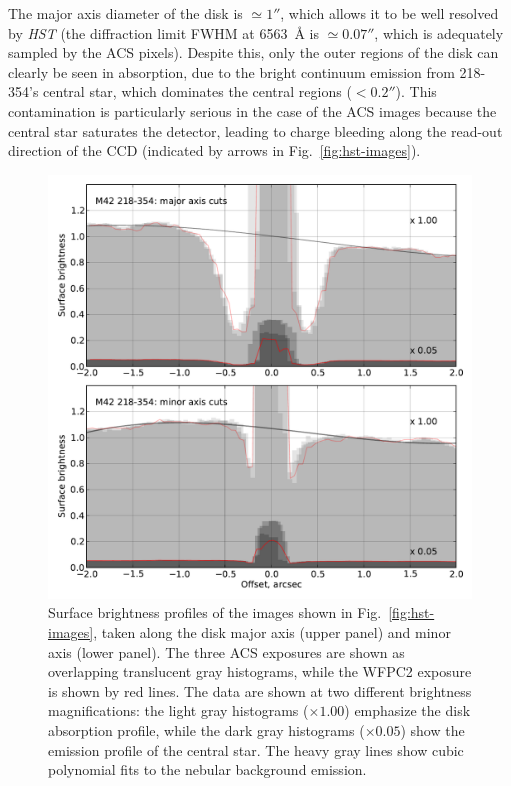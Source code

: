 \documentclass[oneside, 11pt]{article}
\begin{document}
The major axis diameter of the disk is \(\simeq 1''\), which allows it to be well resolved by \textit{HST} (the diffraction limit FWHM at 6563~\AA{} is \(\simeq 0.07''\), which is adequately sampled by the ACS pixels).  Despite this, only the outer regions of the disk can clearly be seen in absorption, due to the bright continuum emission from 218-354's central star, which dominates the central regions (\(< 0.2''\)).   This contamination is particularly serious in the case of the ACS images because the central star saturates the detector, leading to charge bleeding along the read-out direction of the CCD (indicated by arrows in Fig.~\ref{fig:hst-images}). 

\begin{figure}
  \centering
  \includegraphics[width=\linewidth]{profiles-acs-218-354}
  \caption{Surface brightness profiles of the images shown in Fig.~\ref{fig:hst-images}, taken along the disk major axis (upper panel) and minor axis (lower panel).  
    The three ACS exposures are shown as overlapping translucent gray histograms, while the WFPC2 exposure is shown by red lines.
  The data are shown at two different brightness magnifications: the light gray histograms (\(\times 1.00\)) emphasize the disk absorption profile, while the dark gray histograms (\(\times 0.05\)) show the emission profile of the central star.  
  The heavy gray lines show cubic polynomial fits to the nebular background emission. }
  \label{fig:hst-profiles}
\end{figure}
\end{document}
